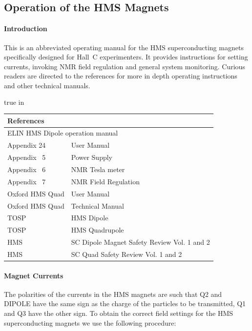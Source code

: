 {\subsection{Operation of the HMS Magnets}

\paragraph{Introduction}

This is an abbreviated operating manual for the HMS superconducting
magnets specifically designed for Hall~C experimenters. It provides
instructions for setting currents, invoking NMR field regulation and
general system monitoring.  Curious readers are directed to the
references for more in depth operating instructions and other technical
manuals.

 true in
\begin{center}
\begin{tabular}{ll}
\multicolumn{2}{l}{\bf References}\\
\hline
\multicolumn{2}{l}{ELIN HMS Dipole operation manual}\\
Appendix 24 &  User Manual \\
Appendix ~5 &  Power Supply \\
Appendix ~6 &  NMR Tesla meter \\
Appendix ~7 &  NMR Field Regulation \\
Oxford HMS Quad & User Manual \\
Oxford HMS Quad & Technical Manual \\
TOSP & HMS Dipole \\
TOSP & HMS Quadrupole \\
HMS & SC Dipole Magnet Safety Review Vol. 1 and 2 \\
HMS & SC Quad Safety Review Vol. 1 and 2 
\end{tabular}
\end{center}

\paragraph{Magnet Currents}

The polarities of the currents in the HMS magnets are such that
Q2 and DIPOLE have the same sign as the charge of the particles
to be transmitted, Q1 and Q3 have the other sign.
To obtain the correct field settings for the HMS superconducting magnets
we use the following procedure:

}

